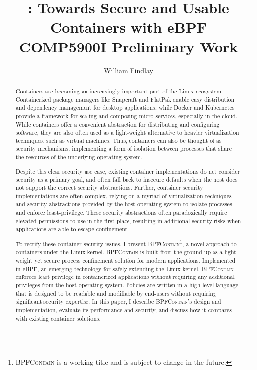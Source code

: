 \documentclass[dvipsnames, 12pt]{article}
\title{\Large \bpfcontain: Towards Secure and Usable Containers with eBPF\\{\large COMP5900I Preliminary Work}}
\author{William Findlay}
\def\bpfcontain{\textsc{BPFContain}}
\begin{document}

\maketitle
\thispagestyle{empty}

\vfill
\begin{abstract}
\noindent
{}
Containers are becoming an increasingly important part of the Linux ecosystem.
Containerized package managers like Snapcraft \cite{snap} and FlatPak
\cite{flatpak} enable easy distribution and dependency management for desktop
applications, while Docker \cite{docker} and Kubernetes \cite{kubernetes}
provide a framework for scaling and composing micro-services, especially in the
cloud.  While containers offer a convenient abstraction for distributing and
configuring software, they are also often used as a light-weight alternative to
heavier virtualization techniques, such as virtual machines. Thus, containers
can also be thought of as security mechanisms, implementing a form of isolation
between processes that share the resources of the underlying operating system.

Despite this clear security use case, existing container implementations do not
consider security as a primary goal, and often fall back to insecure defaults
when the host does not support the correct security abstractions. Further,
container security implementations are often complex, relying on a myriad of
virtualization techniques and security abstractions provided by the host
operating system to isolate processes and enforce least-privilege. These
security abstractions often paradoxically require elevated permissions to use in
the first place, resulting in additional security risks when applications are
able to escape confinement.

To rectify these container security issues, I present
\bpfcontain{}\footnote{\bpfcontain{} is a working title and is subject to change in the
future.}, a novel approach to containers under the Linux kernel. \bpfcontain{} is
built from the ground up as a light-weight yet secure process confinement
solution for modern applications. Implemented in eBPF, an emerging technology
for safely extending the Linux kernel, \bpfcontain{} enforces least privilege in
containerized applications without requiring any additional privileges from the
host operating system. Policies are written in a high-level language that is
designed to be readable and modifiable by end-users without requiring
significant security expertise. In this paper, I describe \bpfcontain{}'s design and
implementation, evaluate its performance and security, and discuss how it
compares with existing container solutions.

\end{abstract}
\vfill
\vfill
\end{document}
